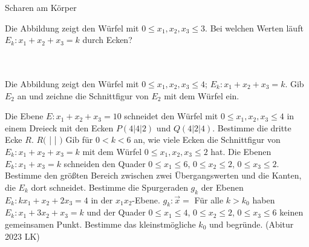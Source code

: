 \setcounter{aufgabe}{15}

\begin{aufgabe}{Scharen am Körper}
\begin{teile}
\teil Die Abbildung zeigt den Würfel mit $0 \le x_1, x_2, x_3 \le 3$. Bei welchen Werten läuft $E_k: x_1 + x_2 + x_3 = k$ durch Ecken? \\  \\  \\ 

\begin{ksys3}\end{ksys3}
\teil Die Abbildung zeigt den Würfel mit $0 \le x_1, x_2, x_3 \le 4$; $E_k: x_1 + x_2 + x_3 = k$. Gib $E_2$ an und zeichne die Schnittfigur von $E_2$ mit dem Würfel ein.

\begin{ksys3}\end{ksys3}
\teil Die Ebene $E: x_1 + x_2 + x_3 = 10$ schneidet den Würfel mit $0 \le x_1, x_2, x_3 \le 4$ in einem Dreieck mit den Ecken $P(4 | 4 | 2)$ und $Q(4 | 2 | 4)$. Bestimme die dritte Ecke $R$. $R($ \leerfeld | \leerfeld | \leerfeld $)$
\teil Gib für $0 < k < 6$ an, wie viele Ecken die Schnittfigur von $E_k: x_1 + x_2 + x_3 = k$ mit dem Würfel $0 \le x_1, x_2, x_3 \le 2$ hat.
\teil Die Ebenen $E_k: x_1 + x_3 = k$ schneiden den Quader $0 \le x_1 \le 6$, $0 \le x_2 \le 2$, $0 \le x_3 \le 2$. Bestimme den größten Bereich zwischen zwei Übergangswerten und die Kanten, die $E_k$ dort schneidet.
\teil Bestimme die Spurgeraden $g_k$ der Ebenen $E_k: k x_1 + x_2 + 2x_3 = 4$ in der $x_1x_2$-Ebene. $g_k: \vec{x} = $ \leerfeld
\teil Für alle $k > k_0$ haben $E_k: x_1 + 3x_2 + x_3 = k$ und der Quader $0 \le x_1 \le 4$, $0 \le x_2 \le 2$, $0 \le x_3 \le 6$ keinen gemeinsamen Punkt. Bestimme das kleinstmögliche $k_0$ und begründe. \hfill (Abitur 2023 LK)
\end{teile}
\end{aufgabe}

